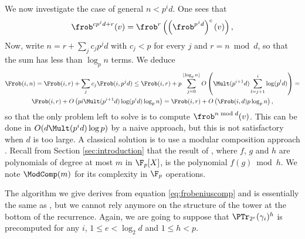 We now investigate the case of general $n<p^id$. One sees that
\begin{equation*}
  \frob^{cp^jd + r}(v) = \frob^r\left(\left(\frob^{p^jd}\right)^c(v)\right),
\end{equation*}
Now, write $n = r+\sum_jc_jp^jd$ with $c_j<p$ for every $j$ and
$r=n\bmod d$, so that the sum has less than $\log_pn$ terms. We deduce
\begin{multline*}
  \Frob(i,n) = \Frob(i,r) + \sum_jc_j\Frob(i,p^jd) \le
  \Frob(i,r) +
  p\sum_{j=0}^{\lfloor\log_pn\rfloor} 
  O\left(\Mult(p^{i+1}d)\sum_{l=j+1}^i\log(p^ld)\right)=\\
  \Frob(i,r) + O\left(pi\Mult(p^{i+1}d)\log(p^id)\log_pn\right) =
  \Frob(i,r) + O\left(\Frob(i,d)p\log_pn\right),
\end{multline*}
so that the only problem left to solve is to compute $\frob^{n\bmod
  d}(v)$. This can be done in $O(d\Mult(p^id)\log p)$ by a naive
approach, but this is not satisfactory when $d$ is too large. A
classical solution is to use a modular composition approach
\cite{}. Recall from Section \ref{sec:introduction} that the result of
, where $f$, $g$ and $h$ are polynomials of
degree at most $m$ in $\F_p[X]$, is the polynomial $f(g)\bmod h$. We
note $\ModComp(m)$ for its complexity in $\F_p$ operations.

The algorithm we give derives from equation \eqref{eq:frobeniuscomp}
and is essentially the same as , but we
cannot rely anymore on the structure of the tower at the bottom of the
recurrence. Again, we are going to suppose that
$\PTr_{2^e}(\gamma_i)^h$ is precomputed for any $i$, $1\le e<\log_2d$
and $1\le h<p$.

